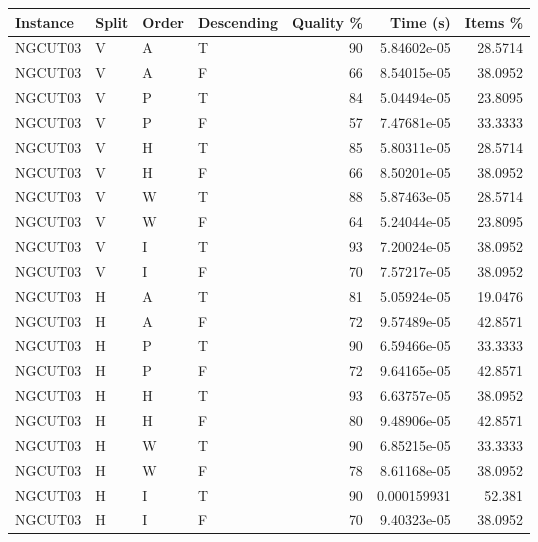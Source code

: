 \begin{tabular}{llllrrr}
    \hline
    Instance & Split & Order & Descending & Quality \% & Time (s)    & Items \% \\
    \hline
    NGCUT03  & V     & A     & T          & 90         & 5.84602e-05 & 28.5714  \\
    NGCUT03  & V     & A     & F          & 66         & 8.54015e-05 & 38.0952  \\
    NGCUT03  & V     & P     & T          & 84         & 5.04494e-05 & 23.8095  \\
    NGCUT03  & V     & P     & F          & 57         & 7.47681e-05 & 33.3333  \\
    NGCUT03  & V     & H     & T          & 85         & 5.80311e-05 & 28.5714  \\
    NGCUT03  & V     & H     & F          & 66         & 8.50201e-05 & 38.0952  \\
    NGCUT03  & V     & W     & T          & 88         & 5.87463e-05 & 28.5714  \\
    NGCUT03  & V     & W     & F          & 64         & 5.24044e-05 & 23.8095  \\
    NGCUT03  & V     & I     & T          & 93         & 7.20024e-05 & 38.0952  \\
    NGCUT03  & V     & I     & F          & 70         & 7.57217e-05 & 38.0952  \\
    NGCUT03  & H     & A     & T          & 81         & 5.05924e-05 & 19.0476  \\
    NGCUT03  & H     & A     & F          & 72         & 9.57489e-05 & 42.8571  \\
    NGCUT03  & H     & P     & T          & 90         & 6.59466e-05 & 33.3333  \\
    NGCUT03  & H     & P     & F          & 72         & 9.64165e-05 & 42.8571  \\
    NGCUT03  & H     & H     & T          & 93         & 6.63757e-05 & 38.0952  \\
    NGCUT03  & H     & H     & F          & 80         & 9.48906e-05 & 42.8571  \\
    NGCUT03  & H     & W     & T          & 90         & 6.85215e-05 & 33.3333  \\
    NGCUT03  & H     & W     & F          & 78         & 8.61168e-05 & 38.0952  \\
    NGCUT03  & H     & I     & T          & 90         & 0.000159931 & 52.381   \\
    NGCUT03  & H     & I     & F          & 70         & 9.40323e-05 & 38.0952  \\

\end{tabular}
